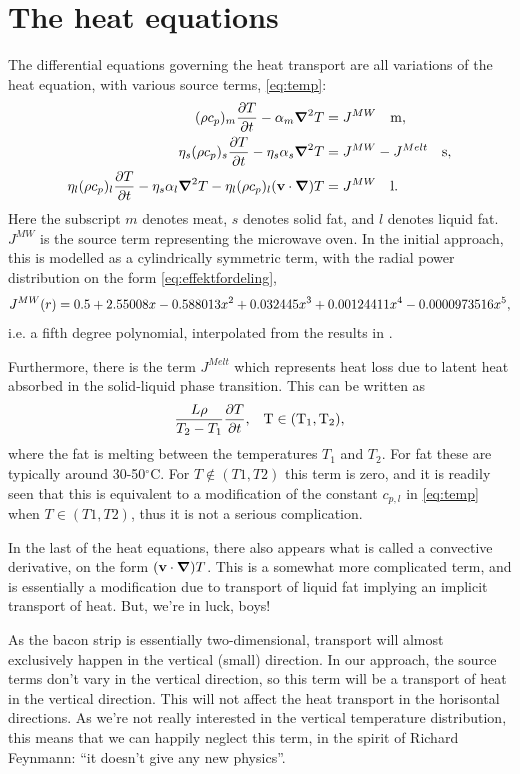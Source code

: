\section{The heat equations}
The differential equations governing the heat transport are all variations of the heat
equation, with various source terms, \cref{eq:temp}:
\begin{align}
  \label{eq:temp}
  (\rho c_p)_m \frac{\partial T}{\partial t} - \alpha_m \mbox{\boldmath$ \nabla $} ^2 T &= J^{MW} \quad \rm{m,} \\
  \eta_s (\rho c_p)_s \frac{\partial T}{\partial t} - \eta_s\alpha_s \mbox{\boldmath$ \nabla $} ^2 T &= J^{MW} - J^{Melt}  \quad \rm{s,} \\
  \eta_l (\rho c_p)_l \frac{\partial T}{\partial t} - \eta_s\alpha_l \mbox{\boldmath$ \nabla $} ^2 T - \eta_l(\rho c_p)_l(\mathbf{v}\cdot
  \mbox{\boldmath$ \nabla $})T &= J^{MW}  \quad \rm{l.}
\end{align}
Here the subscript $m$ denotes meat, $s$ denotes solid fat, and $l$ denotes
liquid fat. $J^{MW}$ is the source term representing the microwave oven.
In the initial approach, this is modelled as a cylindrically symmetric term,
with the radial power distribution on the form \cref{eq:effektfordeling},
\begin{equation}
  J^{MW}(r) = 0.5 + 2.55008x - 0.588013x^2 + 0.032445x^3 + 0.00124411x^4 - 0.0000973516x^5 \rm{,}
  \label{eq:effektfordeling}
\end{equation}
i.e. a fifth degree polynomial, interpolated from the results in \cite{huang+zhu}.

Furthermore, there is the term $J^{Melt}$ which represents heat loss due to
latent heat absorbed in the solid-liquid phase transition. This can be written as 
\[ \frac{L \rho}{T_2-T_1} \frac{\partial T}{\partial t} \rm{,} \quad T \in (T_1,T_2) \rm{,}\]
where the fat is melting between the temperatures $T_1$ and $T_2$. For fat these
are typically around 30-50$^\circ$C. For $T \notin (T1,T2)$ this term is zero,
and it is readily seen that this is equivalent to a modification of the constant
$c_{p,l}$ in \cref{eq:temp} when $T \in (T1,T2)$, thus it is not a serious
complication.

In the last of the heat equations, there also appears what is called a
convective derivative, on the form $(\mathbf{v}\cdot \mbox{\boldmath$ \nabla $})T$. This is a somewhat
more complicated term, and is essentially a modification due to transport of
liquid fat implying an implicit transport of heat. But, we're in luck, boys! 

As the bacon strip is essentially two-dimensional, transport will almost
exclusively happen in the vertical (small) direction. In our approach, the
source terms don't vary in the vertical direction, so this term will be a transport
of heat in the vertical direction. This will not affect the heat transport in
the horisontal directions.  As we're not really
interested in the vertical temperature distribution, this means that we can
happily neglect this term, in the spirit of Richard Feynmann: ``it doesn't give
any new physics''.


